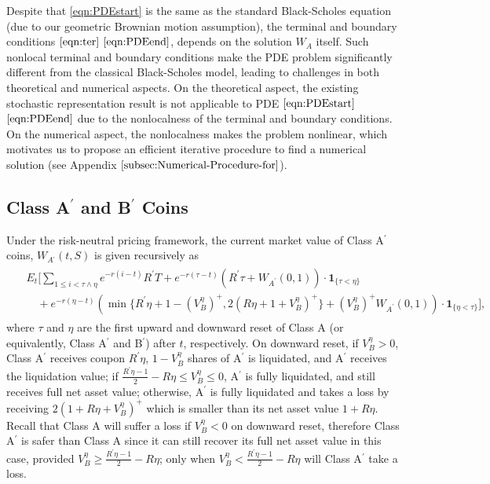 \documentclass[final,pdftex]{ectaart}
\newcommand{\Ap}{A\ensuremath{^\prime}\xspace}
\newcommand{\Bp}{B\ensuremath{^\prime}\xspace}
\theoremstyle{plain}
\begin{document}
 Despite that \eqref{eqn:PDEstart} is the same as the standard Black-Scholes equation (due to our geometric Brownian motion assumption), the terminal and boundary conditions $\eqref{eqn:ter}$ \textendash{} $\eqref{eqn:PDEend}$, depends on the solution $W_{A}$ itself. Such nonlocal terminal and boundary conditions make the PDE problem significantly different from the classical Black-Scholes model, leading to challenges in both theoretical and numerical aspects. On the theoretical aspect, the existing stochastic representation result is not applicable to PDE $\eqref{eqn:PDEstart}$ \textendash{} $\eqref{eqn:PDEend}$ due to the nonlocalness of the terminal and boundary conditions. On the numerical aspect, the nonlocalness makes the problem nonlinear, which motivates us to propose an efficient iterative procedure to find a numerical solution (see Appendix $\ref{subsec:Numerical-Procedure-for}$).



\subsection{\texorpdfstring{Class \Ap and \Bp Coins}{Lg}}
Under the risk-neutral pricing framework, the current market value of Class \Ap coins, $W_{\Ap}(t,S)$ is given recursively as
\begin{align*}
\begin{split} ~& E_{t}\Bigg[\sum_{1\le i<\tau\land\eta}e^{-r(i-t)}R^\prime T+e^{-r(\tau-t)}(R^\prime\tau+W_{A^\prime}(0,1))\cdot\mathbf{1}_{\{\tau<\eta\}}\\
 & \quad+e^{-r(\eta-t)}\left(\min\{R^\prime\eta+1-(V_{B}^{\eta})^+,2(R\eta+1+V_B^{\eta})^+\}+(V_{B}^{\eta})^+W_{A^\prime}(0,1)\right)\cdot\mathbf{1}_{\{\eta<\tau\}}\Bigg],
\end{split}
\end{align*}
where $\tau$ and $\eta$ are the first upward and downward reset of Class A (or equivalently, Class \Ap and \Bp) after $t$, respectively. On downward reset, if $V_B^{\eta}>0$, Class \Ap receives coupon $R^\prime\eta$, $1-V_B^{\eta}$ shares of \Ap is liquidated, and \Ap receives the liquidation value; if $\frac{R^\prime\eta-1}{2}-R\eta\le V_B^{\eta}\le 0$, \Ap is fully liquidated, and still receives full net asset value; otherwise, \Ap is fully liquidated and takes a loss by receiving $2(1+R\eta+V_B^{\eta})^+$ which is smaller than its net asset value $1+R\eta$. Recall that Class A will suffer a loss if $V_B^\eta<0$ on downward reset, therefore Class \Ap is safer than Class A since it can still recover its full net asset value in this case, provided $V_B^{\eta}\ge \frac{R^\prime\eta-1}{2}-R\eta$; only when $V_B^{\eta}< \frac{R^\prime\eta-1}{2}-R\eta$ will Class \Ap take a loss.
\end{document}
